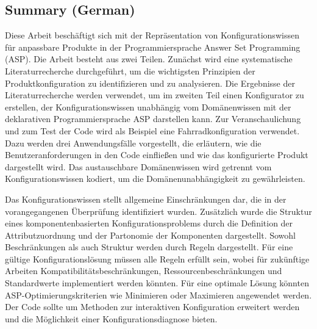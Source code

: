\newpage

\subsection{Summary (German)}
Diese Arbeit beschäftigt sich mit der Repräsentation von Konfigurationswissen für anpassbare Produkte in der Programmiersprache Answer Set Programming (ASP). Die Arbeit besteht aus zwei Teilen. Zunächst wird eine systematische Literaturrecherche durchgeführt, um die wichtigsten Prinzipien der Produktkonfiguration zu identifizieren und zu analysieren. Die Ergebnisse der Literaturrecherche werden verwendet, um im zweiten Teil einen Konfigurator zu erstellen, der Konfigurationswissen unabhängig vom Domänenwissen mit der deklarativen Programmiersprache ASP darstellen kann. Zur Veranschaulichung und zum Test der Code wird als Beispiel eine Fahrradkonfiguration verwendet. Dazu werden drei Anwendungsfälle vorgestellt, die erläutern, wie die Benutzeranforderungen in den Code einfließen und wie das konfigurierte Produkt dargestellt wird. Das austauschbare Domänenwissen wird getrennt vom Konfigurationswissen kodiert, um die Domänenunabhängigkeit zu gewährleisten.\newline

Das Konfigurationswissen stellt allgemeine Einschränkungen dar, die in der vorangegangenen Überprüfung identifiziert wurden. Zusätzlich wurde die Struktur eines komponentenbasierten Konfigurationsproblems durch die Definition der Attributzuordnung und der Partonomie der Komponenten dargestellt. Sowohl Beschränkungen als auch Struktur werden durch Regeln dargestellt. Für eine gültige Konfigurationslösung müssen alle Regeln erfüllt sein, wobei für zukünftige Arbeiten Kompatibilitätsbeschränkungen, Ressourcenbeschränkungen und Standardwerte implementiert werden könnten. Für eine optimale Lösung könnten ASP-Optimierungskriterien wie Minimieren oder Maximieren angewendet werden. Der Code sollte um Methoden zur interaktiven Konfiguration erweitert werden und die Möglichkeit einer Konfigurationsdiagnose bieten.
